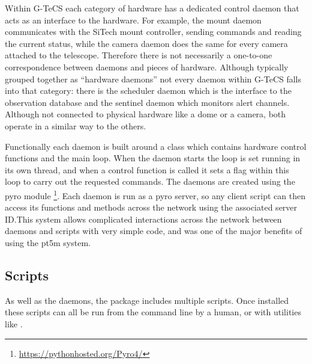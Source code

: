 \begin{colsection}
\begin{colsection}
Within G-TeCS each category of hardware has a dedicated control daemon that acts as an interface to the hardware. For example, the mount daemon communicates with the SiTech mount controller, sending commands and reading the current status, while the camera daemon does the same for every camera attached to the telescope. Therefore there is not necessarily a one-to-one correspondence between daemons and pieces of hardware. Although typically grouped together as ``hardware daemons'' not every daemon within G-TeCS falls into that category: there is the scheduler daemon which is the interface to the observation database and the sentinel daemon which monitors alert channels. Although not connected to physical hardware like a dome or a camera, both operate in a similar way to the others.

Functionally each daemon is built around a  class which contains hardware control functions and the main loop. When the daemon starts the loop is set running in its own thread, and when a control function is called it sets a flag within this loop to carry out the requested commands. The daemons are created using the \gls{pyro} module \footnote{\url{https://pythonhosted.org/Pyro4/}}. Each daemon is run as a \gls{pyro} server, so any client script can then access its functions and methods across the network using the associated server ID.\@ This system allows complicated interactions across the network between daemons and scripts with very simple code, and was one of the major benefits of using the \gls{pt5m} system.

\end{colsection}


\subsection{Scripts}
\label{sec:scripts}
\begin{colsection}

As well as the daemons, the  package includes multiple  scripts. Once installed these scripts can all be run from the command line by a human, or with utilities like .


\end{colsection}
\end{colsection}
